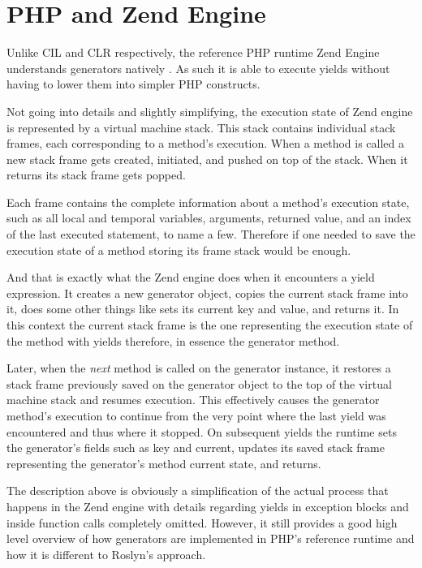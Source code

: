 \section{PHP and Zend Engine}

Unlike CIL and CLR respectively, the reference PHP runtime Zend Engine understands generators natively \citep{ZendGen}. As such it is able to execute yields without having to lower them into simpler PHP constructs.

Not going into details and slightly simplifying, the execution state of Zend engine is represented by a virtual machine stack. This stack contains individual stack frames, each corresponding to a method’s execution. When a method is called a new stack frame gets created, initiated, and pushed on top of the stack. When it returns its stack frame gets popped.

Each frame contains the complete information about a method’s execution state, such as all local and temporal variables, arguments, returned value, and an index of the last executed statement, to name a few. Therefore if one needed to save the execution state of a method storing its frame stack would be enough.

And that is exactly what the Zend engine does when it encounters a yield expression. It creates a new generator object, copies the current stack frame into it, does some other things like sets its current key and value, and returns it. In this context the current stack frame is the one representing the execution state of the method with yields therefore, in essence the generator method.

Later, when the \emph{next} method is called on the generator instance, it restores a stack frame previously saved on the generator object to the top of the virtual machine stack and resumes execution. This effectively causes the generator method’s execution to continue from the very point where the last yield was encountered and thus where it stopped. On subsequent yields the runtime sets the generator’s fields such as key and current, updates its saved stack frame representing the generator’s method current state, and returns.

The description above is obviously a simplification of the actual process that happens in the Zend engine with details regarding yields in exception blocks and inside function calls completely omitted. However, it still provides a good high level overview of how generators are implemented in PHP’s reference runtime and how it is different to Roslyn’s approach.  
